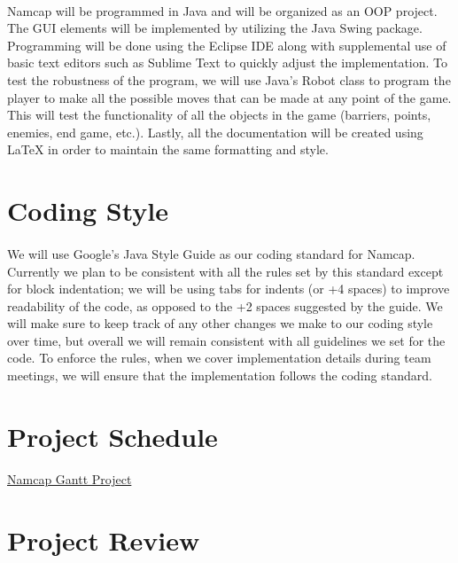 \documentclass{article}
\begin{document}
\paragraph{}
Namcap will be programmed in Java and will be organized as an OOP project. The GUI elements will be implemented by utilizing the Java Swing package. Programming will be done using the Eclipse IDE along with supplemental use of basic text editors such as Sublime Text to quickly adjust the implementation. To test the robustness of the program, we will use Java's Robot class to program the player to make all the possible moves that can be made at any point of the game. This will test the functionality of all the objects in the game (barriers, points, enemies, end game, etc.). Lastly, all the documentation will be created using LaTeX in order to maintain the same formatting and style.

\section{Coding Style}

\paragraph{}
We will use Google's Java Style Guide as our coding standard for Namcap. Currently we plan to be consistent with all the rules set by this standard except for block indentation; we will be using tabs for indents (or +4 spaces) to improve readability of the code, as opposed to the +2 spaces suggested by the guide. We will make sure to keep track of any other changes we make to our coding style over time, but overall we will remain consistent with all guidelines we set for the code. To enforce the rules, when we cover implementation details during team meetings, we will ensure that the implementation follows the coding standard.

\section{Project Schedule}
\href{run:NamcapGanttProject.gan}{Namcap Gantt Project}

\section{Project Review}
\end{document}
